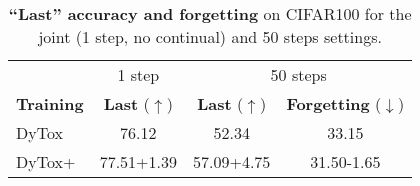 \begin{table}[t]
    \centering
    \begin{tabular}{@{}l|c|cc}
        \hline
                                                        & 1 step                                          & \multicolumn{2}{c}{50 steps}                                                    \\
        \textbf{Training}                               & \textbf{Last} ($\uparrow$)                      & \textbf{Last} ($\uparrow$)   & \textbf{Forgetting} ($\downarrow$)\Tstrut\Bstrut \\
        \hline
        DyTox                                           & 76.12                                           & 52.34                        & 33.15 \Tstrut                                    \\
        DyTox+                                          & 77.51\scriptsize{\textcolor{OliveGreen}{+1.39}} &
        57.09\scriptsize{\textcolor{OliveGreen}{+4.75}} &
        31.50\scriptsize{\textcolor{OliveGreen}{-1.65}}\Bstrut                                                                                                                              \\
        \hline
    \end{tabular}
    \caption{\textbf{``Last'' accuracy and forgetting} on CIFAR100 for the joint (1 step, no
        continual) and 50 steps settings.\vspace{-1em}}
    \label{tab:dytox_training_plus}
\end{table}
